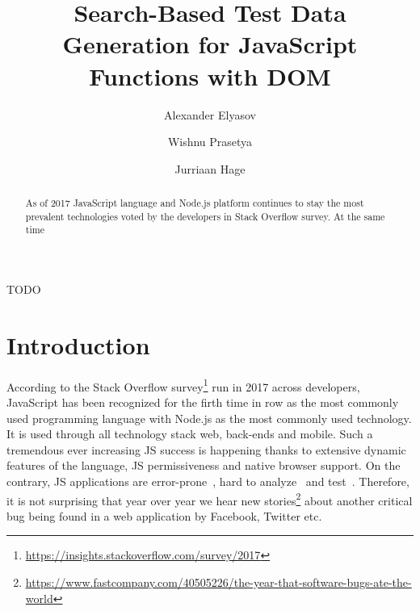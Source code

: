 \documentclass[sigconf]{acmart}
\begin{document}
\title{Search-Based Test Data Generation for JavaScript Functions with DOM}



\author{Alexander Elyasov}

\author{Wishnu Prasetya}

\author{Jurriaan Hage}


\begin{abstract}
As of 2017 JavaScript language and Node.js platform continues to stay the most prevalent technologies voted by the developers in Stack Overflow survey. At the same time  
\end{abstract}

%
%
\begin{CCSXML}
TODO 
\end{CCSXML}





\maketitle


\section{Introduction}
\label{sec.intro}

According to the Stack Overflow survey\footnote{\url{https://insights.stackoverflow.com/survey/2017}} run in 2017 across developers, JavaScript has been recognized for the firth time in row as the most commonly used programming language with Node.js as the most commonly used technology. It is used through all technology stack web, back-ends and mobile. Such a tremendous ever increasing JS success is happening thanks to extensive dynamic features of the language, JS permissiveness and native browser support. On the contrary, JS applications are error-prone~\cite{why}, hard to analyze~\cite{why} and test~\cite{why}. Therefore, it is not surprising that year over year we hear new stories\footnote{\url{https://www.fastcompany.com/40505226/the-year-that-software-bugs-ate-the-world}} about another critical bug being found in a web application by Facebook, Twitter etc. 
\end{document}

